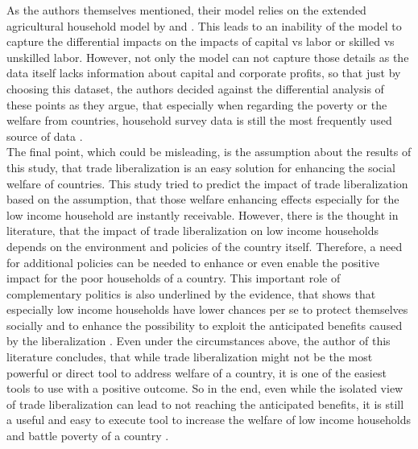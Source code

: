 As the authors themselves mentioned, their model relies on the extended agricultural household model by \cite{Singh.1986} and 
\cite{Benjamin.1993}. This leads to an inability of the model to capture the differential impacts on the impacts of capital vs labor or skilled vs unskilled
labor. However, not only the model can not capture those details as the data itself lacks information about capital and corporate
profits, so that just by choosing this dataset, the authors decided against the differential analysis of these points
as they argue, that especially when regarding the poverty or the welfare from countries, household survey data is still the most frequently
used source of data \parencite[p.~9]{Artuc.2019}.\\

The final point, which could be misleading, is the assumption about the results of this study, that trade liberalization is an
easy solution for enhancing the social welfare of countries. This study tried to predict the impact of trade liberalization
based on the assumption, that those welfare enhancing effects especially for the low income household are instantly receivable.
However, there is the thought in literature, that the impact of trade liberalization on low income households depends on the
environment and policies of the country itself. Therefore, a need for additional policies can be needed to enhance or even
enable the positive impact for the poor households of a country. This important role of complementary politics is also underlined
by the evidence, that shows that especially low income households have lower chances per se to protect themselves socially and
to enhance the possibility to exploit the anticipated benefits caused by the liberalization \parencite[p.~107]{Winters.2004}. 
Even under the circumstances above, the author of this literature concludes, that while trade liberalization might not be 
the most powerful or direct tool to address welfare of a country, it is one of the easiest tools to use with a positive outcome.
So in the end, even while the isolated view of trade liberalization can lead to not reaching the anticipated benefits, it is
still a useful and easy to execute tool to increase the welfare of low income households and battle poverty of a country \parencite[p.~108]{Winters.2004}.\\